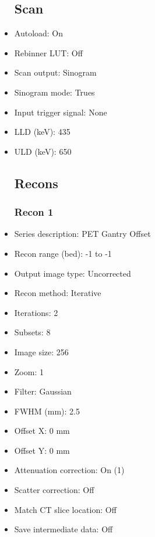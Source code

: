 \documentclass[12pt]{article}
\begin{document}
\begin{itemize}
\subsection{Scan}
\item Autoload: On
\item Rebinner LUT: Off
\item Scan output: Sinogram
\item Sinogram mode: Trues
\item Input trigger signal: None
\item LLD (keV): 435
\item ULD (keV): 650
\subsection{Recons}
\subsubsection{Recon 1}
\item Series description: PET Gantry Offset
\item Recon range (bed): -1 to -1
\item Output image type: Uncorrected
\item Recon method: Iterative
\item Iterations: 2
\item Subsets: 8
\item Image size: 256
\item Zoom: 1
\item Filter: Gaussian
\item FWHM (mm): 2.5
\item Offset X: 0 mm
\item Offset Y: 0 mm
\item Attenuation correction: On (1)
\item Scatter correction: Off
\item Match CT slice location: Off
\item Save intermediate data: Off
\end{itemize}
\end{document}
